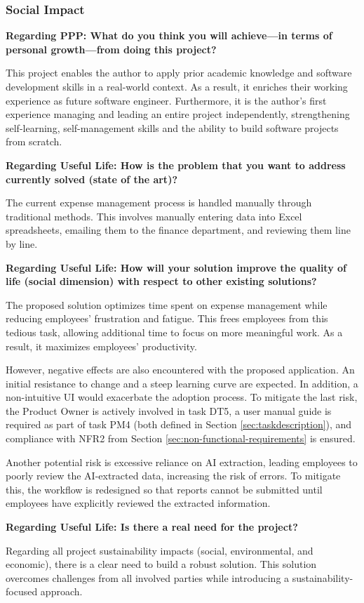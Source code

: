 
\subsubsection{Social Impact}


\textbf{Regarding PPP: What do you think you will achieve—in terms of personal growth—from doing this project?  }
\vspace{-5pt}

This project enables the author to apply prior academic knowledge and software development skills in a real-world context. As a result, it enriches their working experience as future software engineer. Furthermore, it is the author's first experience managing and leading an entire project independently, strengthening self-learning, self-management skills and the ability to build software projects from scratch.


\textbf{Regarding Useful Life: How is the problem that you want to address currently solved (state of the art)?}
\vspace{-5pt}

The current expense management process is handled manually through traditional methods. This involves manually entering data into Excel spreadsheets, emailing them to the finance department, and reviewing them line by line. 


\textbf{Regarding Useful Life: How will your solution improve the quality of life (social dimension) with respect to other existing solutions? }
\vspace{-5pt}

The proposed solution optimizes time spent on expense management while reducing employees' frustration and fatigue. This frees employees from this tedious task, allowing additional time to focus on more meaningful work. As a result, it maximizes employees' productivity.

However, negative effects are also encountered with the proposed application. An initial resistance to change and a steep learning curve are expected. In addition, a non-intuitive UI would exacerbate the adoption process. To mitigate the last risk, the Product Owner is actively involved in task DT5, a user manual guide is required as part of task PM4 (both defined in Section \ref{sec:taskdescription}), and compliance with NFR2 from Section \ref{sec:non-functional-requirements} is ensured. 

Another potential risk is excessive reliance on AI extraction, leading employees to poorly review the AI-extracted data, increasing the risk of errors. To mitigate this, the workflow is redesigned so that reports cannot be submitted until employees have explicitly reviewed the extracted information.



\textbf{Regarding Useful Life: Is there a real need for the project?}
\vspace{-5pt}

Regarding all project sustainability impacts (social, environmental, and economic), there is a clear need to build a robust solution. This solution overcomes challenges from all involved parties while introducing a sustainability-focused approach.
 